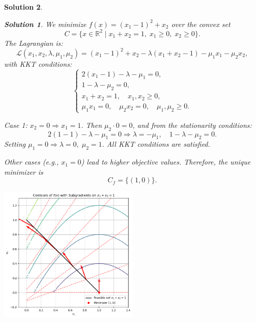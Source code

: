 \documentclass[11pt]{article}
\theoremstyle{mystyle}
\newtheorem*{solution}{Solution}
\begin{document}
        \begin{solution}

                \begin{solution}
                        We minimize \( f(x) = (x_1 - 1)^2 + x_2 \) over the convex set 
                        \[
                        C = \{ x \in \mathbb{R}^2 \mid x_1 + x_2 = 1,\; x_1 \ge 0,\; x_2 \ge 0 \}.
                        \]
                        The Lagrangian is:
                        \[
                        \mathcal{L}(x_1, x_2, \lambda, \mu_1, \mu_2) = (x_1 - 1)^2 + x_2 - \lambda(x_1 + x_2 - 1) - \mu_1 x_1 - \mu_2 x_2,
                        \]
                        with KKT conditions:
                        \[
                        \begin{cases}
                        2(x_1 - 1) - \lambda - \mu_1 = 0, \\
                        1 - \lambda - \mu_2 = 0, \\
                        x_1 + x_2 = 1,\quad x_1, x_2 \ge 0, \\
                        \mu_1 x_1 = 0,\quad \mu_2 x_2 = 0,\quad \mu_1, \mu_2 \ge 0.
                        \end{cases}
                        \]
                        
                        Case 1: \( x_2 = 0 \Rightarrow x_1 = 1 \). Then \( \mu_2 \cdot 0 = 0 \), and from the stationarity conditions:
                        \[
                        2(1 - 1) - \lambda - \mu_1 = 0 \Rightarrow \lambda = -\mu_1, \quad 1 - \lambda - \mu_2 = 0.
                        \]
                        Setting \( \mu_1 = 0 \Rightarrow \lambda = 0,\; \mu_2 = 1 \). All KKT conditions are satisfied.
                        
                        Other cases (e.g., \( x_1 = 0 \)) lead to higher objective values. Therefore, the unique minimizer is
                        \[
                        C_f = \{ (1, 0) \}.
                        \]
                        \end{solution}
\begin{center}
        \includegraphics[width=0.5\textwidth]{subgrad.png}
        \end{center}
        \end{solution}



    
\end{document}
